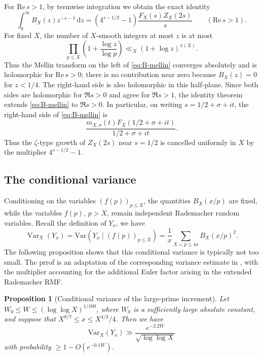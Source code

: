 \documentclass[a4paper,12pt,reqno]{amsart}
\numberwithin{equation}{section}
\newtheorem{proposition}[theorem]{Proposition}
\theoremstyle{remark}
\newcommand{\var}{\operatorname{Var}}
\begin{document}
For $\mathrm{Re}\,s>1$, by termwise integration we obtain the exact identity
\begin{equation}\label{eq:B-mellin}
 \int_0^\infty B_X(z)z^{-s-1}\,\mathrm{d}z
 =\left(4^{s-1/2}-1\right)\frac{F_X(s)Z_X(2s)}s
 \qquad(\mathrm{Re}\,s>1).
\end{equation}
For fixed $X$, the number of $X$-smooth integers at most $z$ is at most
\[
 \prod_{p\leq X}\left(1+\frac{\log z}{\log p}\right)
 \ll_X(1+\log z)^{\pi(X)}.
\]
Thus the Mellin transform on the left of \eqref{eq:B-mellin} converges
absolutely and is holomorphic for $\mathrm{Re}\,s>0$; there is no contribution near
zero because $B_X(z)=0$ for $z<1/4$. The right-hand side is also
holomorphic in this half-plane. Since both sides are holomorphic for $\Re s>0$ and agree for
$\Re s>1$, the identity theorem extends \eqref{eq:B-mellin}
to $\Re s>0$. In particular, on writing
$s=1/2+\sigma+it$, the
right-hand side of \eqref{eq:B-mellin} is
\[
 \frac{m_{X,\sigma}(t)F_X(1/2+\sigma+it)}
 {1/2+\sigma+it}.
\]
Thus the $\zeta$-type growth of $Z_X(2s)$ near $s=1/2$ is
cancelled uniformly in $X$ by the multiplier $4^{s-1/2}-1$.

\subsection{The conditional variance}

Conditioning on the variables $(f(p))_{p\leq X}$, the quantities
$B_X(x/p)$ are fixed, while the variables $f(p)$, $p>X$, remain
independent Rademacher random variables. Recall the definition of $Y_x$, we have
\[
\var_X(Y_x)=\mathrm{Var}\left(Y_x\mid(f(p))_{p\leq X}\right)
 =
 \frac1x\sum_{X<p\leq4x}B_X(x/p)^2.
\]
The following proposition shows that this conditional variance is
typically not too small. The prrof is an adaptation of the corresponding variance estimate
in \cite[Proposition 1]{Harper2013Gaussian}, with the  multiplier accounting for the
additional Euler factor arising in the extended Rademacher RMF.


\begin{proposition}[Conditional variance of the large-prime increment]
\label{prop:B-variance}
Let $W_0\leq W\leq(\log\log X)^{1/100}$, where $W_0$ is a
sufficiently large absolute constant, and suppose that
$X^{8/7}\leq x\leq X^{4/3}/4$. Then we have %
\begin{equation}\label{eq:B-variance-lower}
 \mathrm{Var}_X(Y_x)
 \gg \frac{e^{-2.2W}}{\sqrt{\log\log X}}
\end{equation}
with  probability $\ge1-O(e^{-0.1W})$.
\end{proposition}
\end{document}
